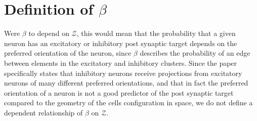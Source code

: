 \documentclass[psamsfonts]{amsart}
\begin{document}
\section{Definition of $\beta$} Were $\beta$ to depend on $\mathcal{Z}$, this would mean that the probability that a given neuron has an excitatory or inhibitory post synaptic target depends on the preferred orientation of the neuron, since $\beta$ describes the probability of an edge between elements in the excitatory and inhibitory clusters. Since the paper specifically states that inhibitory neurons receive projections from excitatory neurons of many different preferred orientations, and that in fact the preferred orientation of a neuron is not a good predictor of the post synaptic target compared to the geometry of the cells configuration in space, we do not define a dependent relationship of $\beta$ on $\mathcal{Z}$.  
\end{document}
